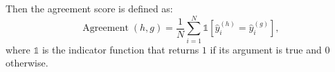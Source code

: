 Then the agreement score is defined as:
\[
\operatorname{Agreement}(h, g) = \frac{1}{N} \sum_{i=1}^N \mathds{1} \left[ \hat{y}^{(h)}_i = \hat{y}^{(g)}_i \right],
\]
where \( \mathds{1} \) is the indicator function that returns \( 1 \) if its argument is true and \( 0 \) otherwise.




